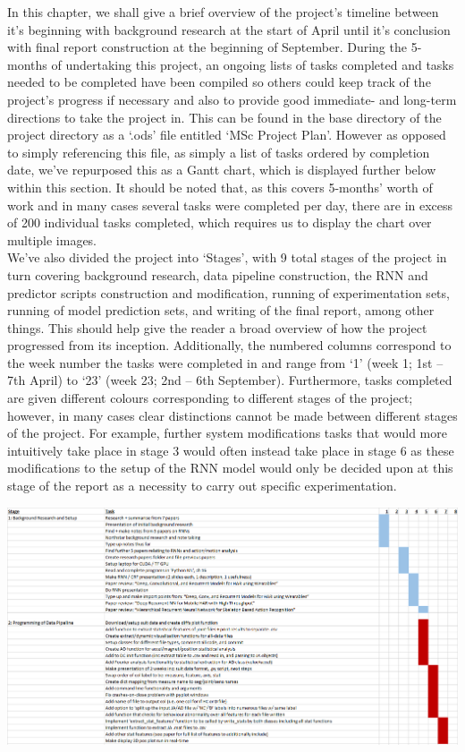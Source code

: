 \documentclass[12pt,twoside]{report}
\begin{document}
\quad In this chapter, we shall give a brief overview of the project’s timeline between it’s beginning with background research at the start of April until it’s conclusion with final report construction at the beginning of September. During the 5-months of undertaking this project, an ongoing lists of tasks completed and tasks needed to be completed have been compiled so others could keep track of the project’s progress if necessary and also to provide good immediate- and long-term directions to take the project in. This can be found in the base directory of the project directory as a ‘.ods’ file entitled ‘MSc Project Plan’. However as opposed to simply referencing this file, as simply a list of tasks ordered by completion date, we’ve repurposed this as a Gantt chart, which is displayed further below within this section. It should be noted that, as this covers 5-months’ worth of work and in many cases several tasks were completed per day, there are in excess of 200 individual tasks completed, which requires us to display the chart over multiple images.\\

\quad We’ve also divided the project into ‘Stages’, with 9 total stages of the project in turn covering background research, data pipeline construction, the RNN and predictor scripts construction and modification, running of experimentation sets, running of model prediction sets, and writing of the final report, among other things. This should help give the reader a broad overview of how the project progressed from its inception. Additionally, the numbered columns correspond to the week number the tasks were completed in and range from ‘1’ (week 1; 1st – 7th April) to ‘23’ (week 23; 2nd – 6th September). Furthermore, tasks completed are given different colours corresponding to different stages of the project; however, in many cases clear distinctions cannot be made between different stages of the project. For example, further system modifications tasks that would more intuitively take place in stage 3 would often instead take place in stage 6 as these modifications to the setup of the RNN model would only be decided upon at this stage of the report as a necessity to carry out specific experimentation.

\begin{center}
\includegraphics[scale=0.4]{project_figures/fig12_1}
\end{center}
\end{document}
